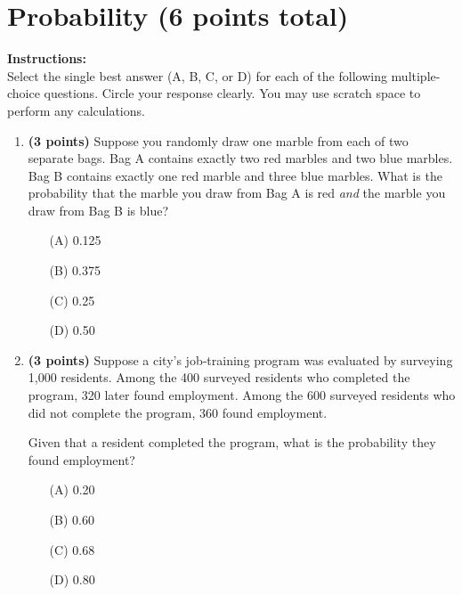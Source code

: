 \documentclass{article}
\newcommand{\blankbox}[2][3cm]{%
    \vspace{-0.5em}
    \begin{figure}[H]
        \makebox[\linewidth]{%
            \begin{tcolorbox}[
                colback=white, 
                colframe=white,  %
                width=#2, %
                height=#1,
                boxrule=0.2mm
            ]
            \end{tcolorbox}
        }
    \end{figure}
    \vspace{-2em}
}
\begin{document}
\section{Probability (6 points total)} 
\noindent\textbf{Instructions:} \\
Select the single best answer (A, B, C, or D) for each of the following multiple-choice questions. Circle your response clearly. You may use scratch space to perform any calculations.
\begin{enumerate}


\item \textbf{(3 points)} Suppose you randomly draw one marble from each of two separate bags. Bag A contains exactly two red marbles and two blue marbles. Bag B contains exactly one red marble and three blue marbles. What is the probability that the marble you draw from Bag A is red \emph{and} the marble you draw from Bag B is blue?
\begin{enumerate}
  \item[(A)] 0.125            %
  \item[(B)] 0.375            %
  \item[(C)] 0.25             %
  \item[(D)] 0.50             %
\end{enumerate} \blankbox[3.5cm]{1.0\linewidth}

\item \textbf{(3 points)}  Suppose a city’s job‐training program was evaluated by surveying 1,000 residents.  
Among the 400 surveyed residents who completed the program, 320 later found employment.  
Among the 600 surveyed residents who did not complete the program, 360 found employment.  

Given that a resident completed the program, what is the probability they found employment?

\begin{enumerate}
  \item[(A)] 0.20  
  \item[(B)] 0.60  
  \item[(C)] 0.68  
  \item[(D)] 0.80  
\end{enumerate}



\end{enumerate}
\end{document}
